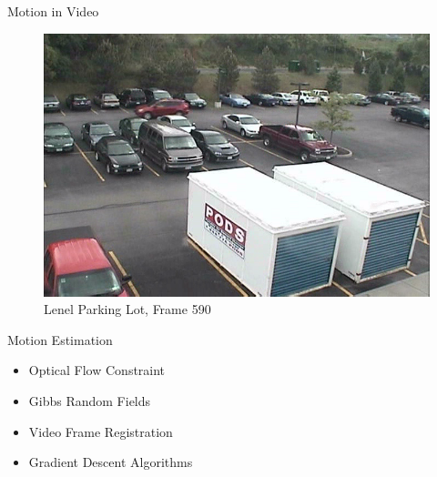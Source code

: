 \documentclass{beamer}
\begin{document}
\begin{frame}[c]{\sc Motion in Video}

\begin{figure}[!h]
\centering
\includegraphics[width=.9\columnwidth]{Lenel010L(590)}
\caption{Lenel Parking Lot, Frame 590}
\label{Lenel590}
\end{figure}

\end{frame}


\begin{frame}[c]{\sc Motion Estimation}

\begin{itemize}
\item Optical Flow Constraint
\item Gibbs Random Fields
\item Video Frame Registration
\item Gradient Descent Algorithms
\end{itemize}

\end{frame}





\end{document}
